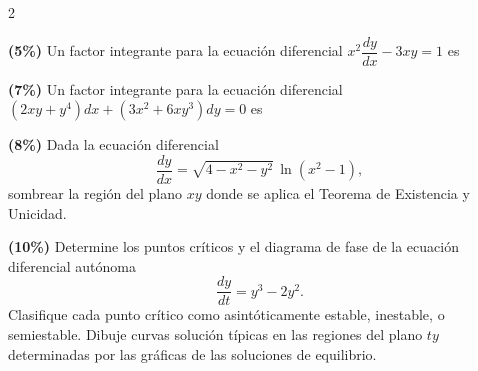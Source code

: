 \documentclass[11pt]{article}
\begin{document}
\begin{multicols}{2}

\begin{opciones}
\item[(a)] \textbf{(5\%)} Un factor integrante para la ecuación diferencial $x^2\dfrac{dy}{dx}-3xy=1$ es \underline{\hspace{2.5cm}}

\item[(b)] \textbf{(7\%)} Un factor integrante para la ecuación diferencial $(2xy+y^4)dx+(3x^2+6xy^3)dy=0$ es \underline{\hspace{2.5cm}}

\item[(c)] \textbf{(8\%)} Dada la ecuación diferencial
\[
\frac{dy}{dx}=\sqrt{4-x^2-y^2}\,\ln(x^2-1),
\]
sombrear la región del plano $xy$ donde se aplica el Teorema de Existencia y Unicidad.

\begin{center}
\end{center}

\columnbreak

\item[(d)] \textbf{(10\%)} Determine los puntos críticos y el diagrama de fase de la ecuación diferencial autónoma
\[
\frac{dy}{dt}=y^3-2y^2.
\]
Clasifique cada punto crítico como asintóticamente estable, inestable, o semiestable. Dibuje curvas solución típicas en las regiones del plano $ty$ determinadas por las gráficas de las soluciones de equilibrio.


\end{opciones}
\end{multicols}
\end{document}
